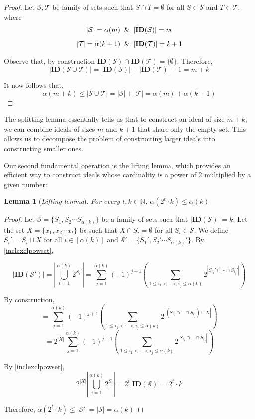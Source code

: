 \documentclass[11pt,a4paper]{article}
\newtheorem{lemma}[theorem]{Lemma}
\theoremstyle{definition}
\begin{document}
\begin{proof}
	Let $\mathcal{S},\mathcal{T}$ be family of sets such that $S\cap 
	T=\emptyset$ for all $S\in \mathcal{S}$ and $T\in \mathcal{T}$, where 
	$$|\mathcal{S}|=\alpha(m) \And |\mathbf{ID}(\mathcal{S})|=m$$
	$$|\mathcal{T}|=\alpha(k+1) \And |\mathbf{ID}(\mathcal{T})|=k+1$$
	
	Observe that, by construction $\mathbf{ID}(\mathcal{S}) \cap 
	\mathbf{ID}(\mathcal{T})=\{\emptyset\}$. Therefore, 
	$$|\mathbf{ID}(\mathcal{S} \cup \mathcal{T})| = |\mathbf{ID}(\mathcal{S})|+ 
	|\mathbf{ID}(\mathcal{T})|-1=m+k$$
	
	It now follows that, 
	$$\alpha(m+k) \leq |\mathcal{S} \cup \mathcal{T}|=|\mathcal{S}|+  
	|\mathcal{T}| = \alpha(m)+\alpha(k+1) $$
\end{proof}

The splitting lemma essentially tells us that to construct an ideal of size 
$m+k$, we can combine ideals of sizes $m$ and $k+1$ that share only the empty 
set. This allows us to decompose the problem of constructing larger ideals 
into constructing smaller ones.

Our second fundamental operation is the lifting lemma, which provides an 
efficient way to construct ideals whose cardinality is a power of 2 
multiplied by a given number:

\begin{lemma}[\textit{Lifting lemma}]\label{lift}
	For every $t,k \in \mathbb{N}$, $ \alpha(2^t\cdot k) \leq \alpha(k)$    
\end{lemma}

\begin{proof}
	Let $\mathcal{S}=\{S_1,S_2\cdots S_{\alpha(k)}\}$ be a family of sets such 
	that $ |\mathbf{ID}(\mathcal{S})|=k$. Let the set $X=\{x_1,x_2\cdots x_t\}$ 
	be such that $ X \cap S_i = \emptyset$ for all $S_i\in \mathcal{S}$. We 
	define $S_i'=S_i \sqcup X$ for all $i \in [\alpha(k)]$ and 
	$\mathcal{S'}=\{S_1',S_2'\cdots S_{\alpha(k)}'\}$. By 
	\cref{inclexclpowset},
	
	$$|\mathbf{ID}(\mathcal{S}')|=|\bigcup_{i=1}^{\alpha(k)} 2^{S_i'} | = 
	\sum_{j=1}^{\alpha(k)}(-1)^{j+1} ( \sum_{1 \leq i_1 < \cdots < i_j \leq 
		\alpha(k)} 2^{|S_{i_1}'\cap \cdots \cap S_{i_j}'|} )$$
	
	By construction,
	$$=\sum_{j=1}^{\alpha(k)}(-1)^{j+1} ( \sum_{1 \leq i_1 < \cdots < i_j 
		\leq \alpha(k)} 2^{|(S_{i_1}\cap \cdots \cap S_{i_j})\sqcup X|} )$$
	$$=2^{|X|}\sum_{j=1}^{\alpha(k)}(-1)^{j+1} ( \sum_{1 \leq i_1 < \cdots < 
		i_j \leq \alpha(k)} 2^{|S_{i_1}\cap \cdots \cap S_{i_j}|} )$$
	
	By \cref{inclexclpowset},
	$$2^{|X|}|\bigcup_{i=1}^{\alpha(k)} 2^{S_i} |=2^t|\mathbf{ID}(\mathcal{S})|
	=2^t\cdot k$$
	
	Therefore, $\alpha(2^t \cdot k)\leq |\mathcal{S}'| = |\mathcal{S}|=\alpha(k)$
\end{proof}
\end{document}
